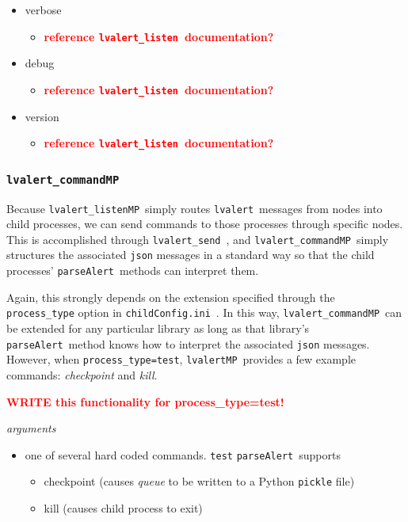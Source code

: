 \documentclass{article}
\newcommand{\FIXME}[1]{\textcolor{red}{\textbf{#1}}}
\newcommand{\alert}{\texttt{lvalert}~}
\newcommand{\lvalertListen}{\texttt{lvalert\_listen}~}
\newcommand{\lvalertSend}{\texttt{lvalert\_send}~}
\newcommand{\lvalertMP}{\texttt{lvalertMP}~}
\newcommand{\lvalertListenMP}{\texttt{lvalert\_listenMP}~}
\newcommand{\lvalertCommandMP}{\texttt{lvalert\_commandMP}~}
\newcommand{\parseAlert}{\texttt{parseAlert}~}
\newcommand{\childConfigini}{\texttt{childConfig.ini}~}
\begin{document}
\begin{itemize}
{         }
    \item{verbose
        \begin{itemize}
            \item{\FIXME{reference \lvalertListen documentation?}}
        \end{itemize}
         }
    \item{debug
        \begin{itemize}
            \item{\FIXME{reference \lvalertListen documentation?}}
        \end{itemize}
         }
    \item{version
        \begin{itemize}
            \item{\FIXME{reference \lvalertListen documentation?}}
        \end{itemize}
         }
\end{itemize}


\subsubsection{\lvalertCommandMP}
\label{sec: lvalertCommandMP}

Because \lvalertListenMP simply routes \alert messages from nodes into child processes, we can send commands to those processes through specific nodes.
This is accomplished through \lvalertSend, and \lvalertCommandMP simply structures the associated \texttt{json} messages in a standard way so that the child processes' \parseAlert methods can interpret them.

Again, this strongly depends on the extension specified through the \texttt{process\_type} option in \childConfigini. 
In this way, \lvalertCommandMP can be extended for any particular library as long as that library's \parseAlert method knows how to interpret the associated \texttt{json} messages.
However, when \texttt{process\_type=test}, \lvalertMP provides a few example commands: \textit{checkpoint} and \textit{kill}.

\FIXME{WRITE this functionality for process\_type=test!}

\vspace{0.5cm}
\noindent
\textit{arguments}

\begin{itemize}
    \item{one of several hard coded commands. \texttt{test} \parseAlert supports
        \begin{itemize}
            \item{checkpoint (causes \textit{queue} to be written to a Python \texttt{pickle} file)}
            \item{kill (causes child process to exit)}
        \end{itemize}
         }
\end{itemize}
\end{document}
